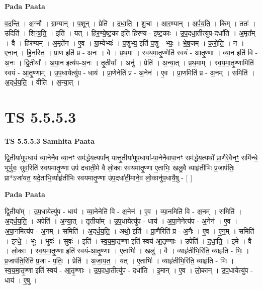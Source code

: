 \documentclass[17pt]{extarticle}
\begin{document}
\textbf{Pada Paata} \newline

व॒द॒न्ति॒ । अ॒ग्नौ । ग्रा॒म्यान् । प॒शून् । प्रेति॑ । द॒धा॒ति॒ । शु॒चा । आ॒र॒ण्यान् । अ॒र्प॒य॒ति॒ । किम् । ततः॑ । उदिति॑ । शिꣳ॒॒ष॒ति॒ । इति॑ । यत् । हि॒र॒ण्ये॒ष्ट॒का इति॑ हिरण्य - इ॒ष्ट॒काः । उ॒प॒दधा॒तीत्यु॑प-दधा॑ति । अ॒मृत᳚म् । वै । हिर॑ण्यम् । अ॒मृते॑न । ए॒व । ग्रा॒म्येभ्यः॑ । प॒शुभ्य॒ इति॑ प॒शु - भ्यः॒ । भे॒ष॒जम् । क॒रो॒ति॒ । न । ए॒ना॒न् । हि॒न॒स्ति॒ । प्रा॒ण इति॑ प्र - अ॒नः । वै । प्र॒थ॒मा । स्व॒य॒मा॒तृ॒ण्णेति॑ स्वयं -  आ॒तृ॒ण्णा । व्या॒न इति॑ वि - अ॒नः । द्वि॒तीया᳚ । अ॒पा॒न इत्य॑प-अ॒नः । तृ॒तीया᳚ । अनु॑ । प्रेति॑ । अ॒न्या॒त् । प्र॒थ॒माम् । स्व॒य॒मा॒तृ॒ण्णामिति॑ स्वयं - आ॒तृ॒ण्णाम् । उ॒प॒धायेत्यु॑प - धाय॑ । प्रा॒णेनेति॑ प्र - अ॒नेन॑ । ए॒व । प्रा॒णमिति॑ प्र - अ॒नम् । समिति॑ । अ॒द्‌र्ध॒य॒ति॒ । वीति॑ । अ॒न्या॒त् ।  \newline





\section{ TS 5.5.5.3 }

\textbf{TS 5.5.5.3 } \newline
\textbf{Samhita Paata} \newline

द्वि॒तीया॑मुप॒धाय॑ व्या॒नेनै॒व व्या॒नꣳ सम॑र्द्धय॒त्यपा᳚न् यात्तृ॒तीया॑मुप॒धाया॑-पा॒नेनै॒वापा॒नꣳ सम॑र्द्धय॒त्यथो᳚ प्रा॒णैरे॒वैनꣳ॒॒ समि॑न्धे॒ भूर्भुवः॒ सुव॒रिति॑ स्वयमातृ॒ण्णा उप॑ दधाती॒मे वै लो॒काः स्व॑यमातृ॒ण्णा ए॒ताभिः॒ खलु॒वै व्याहृ॑तीभिः प्र॒जाप॑तिः॒ प्रा*ऽजा॑यत॒ यदे॒ताभि॒र्व्याहृ॑तीभिः स्वयमातृ॒ण्णा उ॑प॒दधा॑ती॒माने॒व लो॒कानु॑प॒धायै॒षु - [  ] \newline

\textbf{Pada Paata} \newline

द्वि॒तीया᳚म् । उ॒प॒धायेत्यु॑प - धाय॑ । व्या॒नेनेति॑ वि - अ॒नेन॑ । ए॒व । व्या॒नमिति॑ वि - अ॒नम् । समिति॑ । अ॒द्‌र्ध॒य॒ति॒ । अपेति॑ । अ॒न्या॒त् । तृ॒तीया᳚म् । उ॒प॒धायेत्यु॑प - धाय॑ । अ॒पा॒नेनेत्य॑प - अ॒नेन॑ । ए॒व । अ॒पा॒नमित्य॑प - अ॒नम् । समिति॑ । अ॒द्‌र्ध॒य॒ति॒ । अथो॒ इति॑ । प्रा॒णैरिति॑ प्र - अ॒नैः । ए॒व । ए॒न॒म् । समिति॑ । इ॒न्धे॒ । भूः । भुवः॑ । सुवः॑ । इति॑ । स्व॒य॒मा॒तृ॒ण्णा इति॑ स्वयं-आ॒तृ॒ण्णाः । उपेति॑ । द॒धा॒ति॒ । इ॒मे । वै । लो॒काः । स्व॒य॒मा॒तृ॒ण्णा इति॑ स्वयं-आ॒तृ॒ण्णाः । ए॒ताभिः॑ । खलु॑ । वै । व्याहृ॑तीभि॒रिति॒ व्याहृ॑ति - भिः॒ । प्र॒जाप॑ति॒रिति॑ प्र॒जा - प॒तिः॒ । प्रेति॑ । अ॒जा॒य॒त॒ । यत् । ए॒ताभिः॑ । व्याहृ॑तीभि॒रिति॒ व्याहृ॑ति - भिः । स्व॒य॒मा॒तृ॒ण्णा इति॑ स्वयं - आ॒तृ॒ण्णाः । उ॒प॒दधा॒तीत्यु॑प - दधा॑ति । इ॒मान् । ए॒व । लो॒कान् । उ॒प॒धायेत्यु॑प - धाय॑ । ए॒षु ।  \newline
\end{document}
